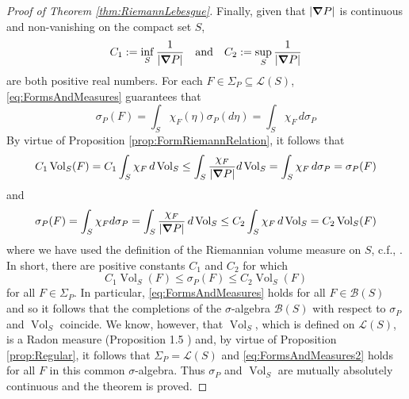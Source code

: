 \documentclass[11pt]{article}
\theoremstyle{remark}
\newcommand{\Vol}{\operatorname{Vol}}
\begin{document}
\begin{proof}[Proof of Theorem \ref{thm:RiemannLebesgue}]
Finally, given that $\abs{\grad P}$ is continuous and non-vanishing on the compact set $S$,
\begin{equation*}
    C_1 := \inf_S\frac{1}{|\grad P|}\quad\mbox{and}\quad C_2 := \sup_{S}\frac{1}{\abs{\grad P }}
\end{equation*}
are both positive real numbers. For each $F\in \Sigma_P\subseteq\mathcal{L}(S)$, \eqref{eq:FormsAndMeasures} guarantees that
\begin{equation*}
    \sigma_P(F)=\int_S\chi_F(\eta)\sigma_P(d\eta)=\int_S \chi_F\,d\sigma_P
\end{equation*}
By virtue of Proposition \ref{prop:FormRiemannRelation}, it follows that
\begin{equation*}
C_1\Vol_S(F)=C_1\int_S \chi_F\,d\Vol_S\leq \int_S \frac{\chi_F}{|\grad P|}d\Vol_S=\int_S \chi_F\,d\sigma_P=\sigma_P(F)
\end{equation*}
and
\begin{equation*}
    \sigma_P(F)=\int_S\chi_F d\sigma_P=\int_S\frac{\chi_F}{|\grad P|}\,d\Vol_S\leq C_2\int_S\chi_F\,d\Vol_S=C_2\Vol_S(F)
\end{equation*}
where we have used the definition of the Riemannian volume measure on $S$, c.f., \cite{amann_analysis_2009}. In short, there are positive constants $C_1$ and $C_2$ for which
\begin{equation}\label{eq:FormsAndMeasures2}
    C_1\Vol_S(F)\leq\sigma_P(F)\leq C_2\Vol_S(F)
\end{equation}
for all $F\in\Sigma_P$. In particular, \eqref{eq:FormsAndMeasures} holds for all $F\in\mathcal{B}(S)$ and so it follows that the completions of the $\sigma$-algebra $\mathcal{B}(S)$ with respect to $\sigma_P$ and $\Vol_S$ coincide. We know, however, that $\Vol_S$, which is defined on $\mathcal{L}(S)$, is a Radon measure (Proposition 1.5 \cite[Chapter XII]{amann_analysis_2009}) and, by virtue of Proposition \ref{prop:Regular}, it follows that $\Sigma_P=\mathcal{L}(S)$ and \eqref{eq:FormsAndMeasures2} holds for all $F$ in this common $\sigma$-algebra. Thus $\sigma_P$ and $\Vol_S$ are mutually absolutely continuous and the theorem is proved.
\end{proof}
\end{document}
